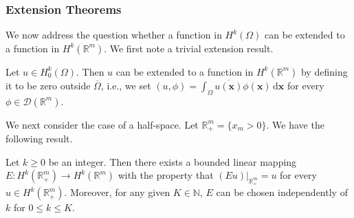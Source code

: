 \subsubsection{Extension Theorems}\label{subsec:sobolev-extension-theorems}

We now address the question whether a function in $H^k(\Omega)$ can be extended to a function in $H^k(\mathbb{R}^m)$. We first note a trivial extension result.

\begin{Lemma}
\label{lem:zero-boundary-sobolev-zero-extension}
Let $u\in H_0^k(\Omega)$. Then $u$ can be extended to a function in $H^k(\mathbb{R}^m)$ by defining it to be zero outside $\overline\Omega$, i.e., we set $(u,\phi)=\int_{\Omega}\overline{u(\bm{x})}\phi(\bm{x})\,\mathrm{d}\bm{x}$ for every $\phi\in\mathcal{D}(\mathbb{R}^m)$.
\end{Lemma}

\begingroup
{}
\renewcommand{\endProof}{\par\nobreak\hfill$\blacksquare$\par\vspace{0.1cm}}
\endgroup

We next consider the case of a half-space. Let $\mathbb{R}_+^m=\{x_m>0\}$. We have the following result.

\begin{Theorem}
\label{thm:halfspace-sobolev-bounded-extension}
Let $k\geq0$ be an integer. Then there exists a bounded linear mapping $E:H^k(\mathbb{R}_+^m)\to H^k(\mathbb{R}^m)$ with the property that $(Eu)|_{\mathbb{R}_+^m}=u$ for every $u\in H^k(\mathbb{R}_+^m)$. Moreover, for any given $K\in\mathbb{N}$, $E$ can be chosen independently of $k$ for $0\leq k\leq K$.
\end{Theorem}

